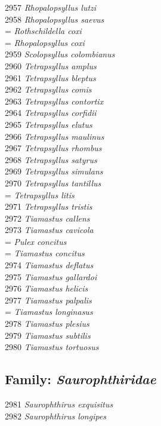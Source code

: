 \documentclass[
]{article}
\begin{document}
2957 \emph{Rhopalopsyllus lutzi}\\
2958 \emph{Rhopalopsyllus saevus}\\
= \emph{Rothschildella coxi}\\
= \emph{Rhopalopsyllus coxi}\\
2959 \emph{Scolopsyllus colombianus}\\
2960 \emph{Tetrapsyllus amplus}\\
2961 \emph{Tetrapsyllus bleptus}\\
2962 \emph{Tetrapsyllus comis}\\
2963 \emph{Tetrapsyllus contortix}\\
2964 \emph{Tetrapsyllus corfidii}\\
2965 \emph{Tetrapsyllus elutus}\\
2966 \emph{Tetrapsyllus maulinus}\\
2967 \emph{Tetrapsyllus rhombus}\\
2968 \emph{Tetrapsyllus satyrus}\\
2969 \emph{Tetrapsyllus simulans}\\
2970 \emph{Tetrapsyllus tantillus}\\
= \emph{Tetrapsyllus litis}\\
2971 \emph{Tetrapsyllus tristis}\\
2972 \emph{Tiamastus callens}\\
2973 \emph{Tiamastus cavicola}\\
= \emph{Pulex concitus}\\
= \emph{Tiamastus concitus}\\
2974 \emph{Tiamastus deflatus}\\
2975 \emph{Tiamastus gallardoi}\\
2976 \emph{Tiamastus helicis}\\
2977 \emph{Tiamastus palpalis}\\
= \emph{Tiamastus longinasus}\\
2978 \emph{Tiamastus plesius}\\
2979 \emph{Tiamastus subtilis}\\
2980 \emph{Tiamastus tortuosus}

\hypertarget{family-saurophthiridae}{%
\subsection{\texorpdfstring{Family:
\emph{Saurophthiridae}}{Family: Saurophthiridae}}\label{family-saurophthiridae}}

2981 \emph{Saurophthirus exquisitus}\\
2982 \emph{Saurophthirus longipes}
\end{document}
